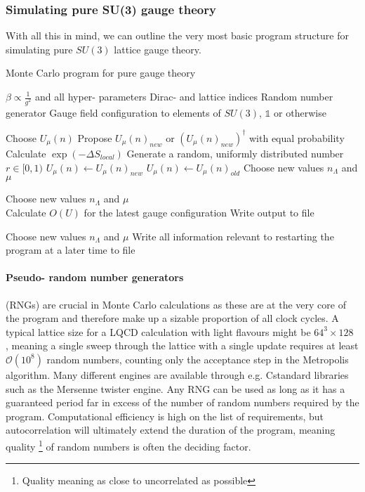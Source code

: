 \documentclass[a4paper,10pt]{article}
\newcommand{\CC}{C\nolinebreak\hspace{-.05em}\raisebox{.4ex}{\tiny\bf +}\nolinebreak\hspace{-.10em}\raisebox{.4ex}{\tiny\bf +}}
\def\CC{{C\nolinebreak[4]\hspace{-.05em}\raisebox{.4ex}{\tiny\bf ++}}}
\begin{document}
\subsubsection{Simulating pure SU(3) gauge theory}
With all this in mind, we can outline the very most basic program structure for simulating pure $SU(3)$ lattice gauge theory.
\begin{algorithm}[H]
\caption{Monte Carlo program for pure gauge theory}\label{alg:cap}
\begin{algorithmic}

\Ensure 
\State $\beta \propto \frac{1}{g^2}$ and all hyper- parameters
\State Dirac- and lattice indices
\State Random number generator 
\State Gauge field configuration to elements of $SU(3)$, $\mathbb{1}$ or otherwise

\State Choose $U_\mu(n)$
\State Propose $U_\mu(n)_{new}$ or $(U_\mu(n)_{new})^\dagger$ with equal probability
\State Calculate $\exp (-\Delta S_{local})$
\State Generate a random, uniformly distributed number $r \in [0,1) $
    \State $U_\mu(n) \gets U_\mu(n)_{new}$
\Else
    \State $U_\mu(n) \gets U_\mu(n)_{old}$
\EndIf
\EndFunction
\State Choose new values $n_\Lambda$ and $\mu$
\EndWhile



\State Choose new values $n_\Lambda$ and $\mu$
\EndFunction
\EndWhile\\

\State Calculate $O(U)$ for the latest gauge configuration
\State Write output to file 

\EndFunction
\State Choose new values $n_\Lambda$ and $\mu$
\EndWhile
\State Write all information relevant to restarting the program at a later time to file 
\end{algorithmic}
\end{algorithm}
\paragraph{Pseudo- random number generators} (RNGs) are crucial in Monte Carlo calculations as these are at the very core of the program and therefore make up a sizable proportion of all clock cycles. A typical lattice size for a LQCD calculation with light flavours might be $64^3\times 128$ \cite{tanabashi2018review}, meaning a single sweep through the lattice with a single update requires at least $\mathcal{O}(10^8)$ random numbers, counting only the acceptance step in the Metropolis algorithm. Many different engines are available through e.g. \CC standard libraries such as the Mersenne twister engine. Any RNG can be used as long as it has a guaranteed period far in excess of the number of random numbers required by the program. Computational efficiency is high on the list of requirements, but autocorrelation will ultimately extend the duration of the program, meaning quality \footnote{Quality meaning as close to uncorrelated as possible} of random numbers is often the deciding factor.
\end{document}

